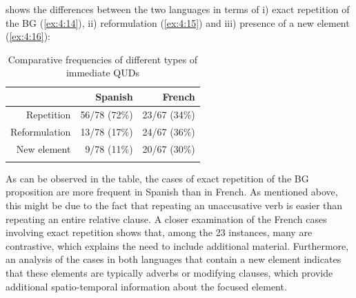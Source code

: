  shows the differences between the two languages in terms of i) exact repetition of the BG (\ref{ex:4:14}), ii) reformulation (\ref{ex:4:15}) and iii) presence of a new element (\ref{ex:4:16}):

\begin{table}[ht]

\begin{tabular}{rrr}
  \lsptoprule
 & Spanish & French \\ 
  \midrule
Repetition & 56/78 (72\%) & 23/67 (34\%) \\ 
Reformulation & 13/78 (17\%)  & 24/67 (36\%) \\ 
New element & 9/78 (11\%)  &  20/67 (30\%)  \\ 
   \lspbottomrule
\end{tabular}
\caption{Comparative frequencies of different types of immediate QUDs}
\label{tab:5.4}
\end{table}

 As can be observed in the table, the cases of exact repetition of the BG proposition are more frequent in Spanish than in French. As mentioned above, this might be due to the fact that repeating an unaccusative verb is easier than repeating an entire relative clause. A closer examination of the French cases involving exact repetition shows that, among the 23 instances, many are contrastive, which explains the need to include additional material. Furthermore, an analysis of the cases in both languages that contain a new element indicates that these elements are typically adverbs or modifying clauses, which provide additional spatio-temporal information about the focused element.

